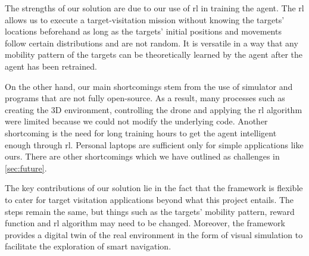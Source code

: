 \documentclass[../main.tex]{subfiles}
\begin{document}
The strengths of our solution are due to our use of \gls{rl} in training
the agent.
The \gls{rl} allows us to execute a target-visitation mission without
knowing the targets' locations beforehand as long as the targets'
initial positions and movements follow certain distributions and are
not random. 
It is versatile in a way that any mobility pattern of the targets can
be theoretically learned by the agent after the agent has been retrained.

On the other hand, our main shortcomings stem from the use of
simulator and programs that are not fully open-source.
As a result, many processes such as creating the 3D environment,
controlling the drone and applying the \gls{rl} algorithm were limited
because we could not modify the underlying code.
Another shortcoming is the need for long training hours to get the
agent intelligent enough through \gls{rl}.
Personal laptops are sufficient only for simple applications like
ours.
There are other shortcomings which we have outlined as challenges in
\cref{sec:future}.

The key contributions of our solution lie in the fact that the framework
is flexible to cater for target visitation applications beyond what
this project entails.
The steps remain the same, but things such as the targets' mobility
pattern, reward function and \gls{rl} algorithm may need to be
changed.
Moreover, the framework provides a digital twin of the real
environment in the form of visual simulation to facilitate the
exploration of smart navigation.
\end{document}
